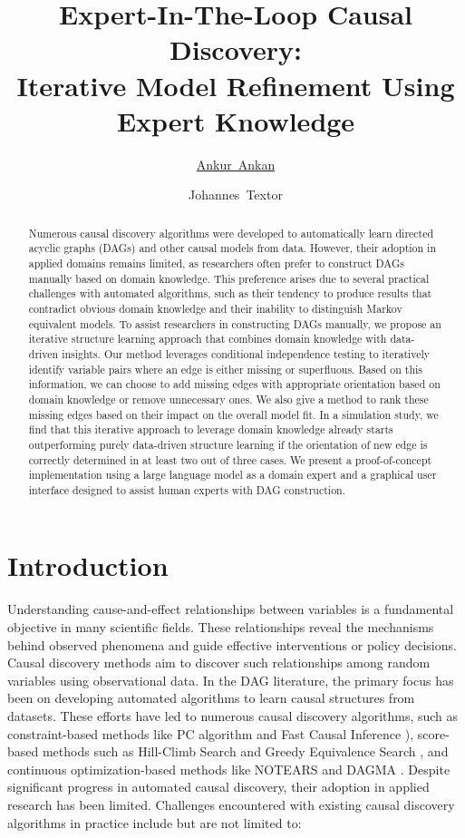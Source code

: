 \documentclass{uai2025} %
\title{Expert-In-The-Loop Causal Discovery: \\ Iterative Model Refinement Using Expert Knowledge}
\author[1]{\href{mailto:<ankur.ankan@ru.nl>?Subject=Your UAI 2025 paper}{Ankur~Ankan}{}}
\author[1]{Johannes~Textor}
\affil[1]{%
    Institute for Computing and Information Sciences\\
    Radboud University\\
    Nijmegen, The Netherlands
}
\begin{document}
\maketitle

\begin{abstract}
	Numerous causal discovery algorithms were developed to automatically learn
	directed acyclic graphs (DAGs) and other causal models from data. However,
	their adoption in applied domains remains limited, as researchers often
	prefer to construct DAGs manually based on domain knowledge. This
	preference arises due to several practical challenges with automated
	algorithms, such as their tendency to produce results that contradict
	obvious domain knowledge and their inability to distinguish Markov equivalent
	models. To assist researchers in constructing DAGs manually, we propose an iterative
	structure learning approach that combines domain knowledge with
	data-driven insights. Our method leverages conditional independence
	testing to iteratively identify variable pairs where an edge is
	either missing or superfluous. Based on this information, we can choose
	to add missing edges with appropriate orientation based on domain
	knowledge or remove unnecessary ones. We also give a method to rank
	these missing edges based on their impact on the overall model fit.
	In a simulation study, we find that this iterative approach to leverage domain 
	knowledge already starts outperforming purely data-driven structure learning if 
	the orientation of new edge is correctly determined in at least two out of three cases.
	We present a proof-of-concept implementation using a large language 
	model as a domain expert and a graphical user interface designed to 
	assist human experts with DAG construction.
\end{abstract}

\section{Introduction}
Understanding cause-and-effect relationships between variables is a fundamental
objective in many scientific fields. These relationships reveal the mechanisms
behind observed phenomena and guide effective interventions or policy
decisions. Causal discovery methods aim to discover such relationships among
random variables using observational data. In the DAG literature, the primary
focus has been on developing automated algorithms to learn causal structures
from datasets. These efforts have led to numerous causal discovery algorithms,
such as constraint-based methods like PC algorithm \citep{Spirtes2001,KalischB07} 
and Fast Causal Inference \citep{Spirtes2000}), score-based methods such as Hill-Climb
Search and Greedy Equivalence Search \citep{Chickering2002}, and continuous
optimization-based methods like NOTEARS \citep{Zheng2018} and DAGMA
\citep{Bello2022}. Despite significant progress in automated causal discovery,
their adoption in applied research has been limited. Challenges encountered with existing
causal discovery algorithms in practice include but are not limited to:
\end{document}
